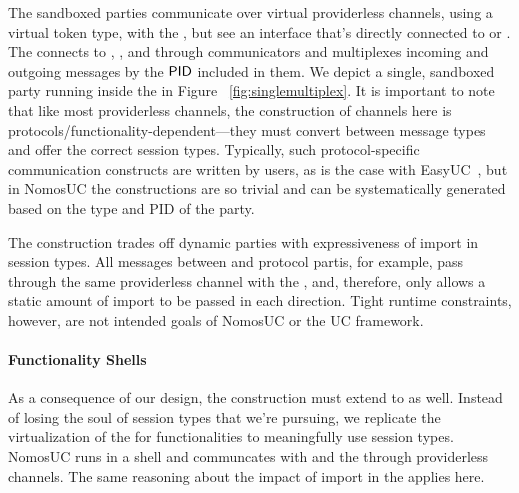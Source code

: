 The sandboxed parties communicate over virtual providerless channels, using a virtual token type, with the \partywrapper, but see an interface that's directly connected to \F or \Z. 
The \partywrapper connects to \F, \A, and \Z through communicators and multiplexes incoming and outgoing messages by the $\mathsf{PID}$ included in them. 
We depict a single, sandboxed party running inside the \partywrapper in Figure ~\ref{fig:singlemultiplex}.
It is important to note that like most providerless channels, the construction of channels here is protocols/functionality-dependent---they must convert between message types and offer the correct session types. 
Typically, such protocol-specific communication constructs are written by users, as is the case with EasyUC~\cite{easyuc}, but in NomosUC the constructions are so trivial and can be systematically generated based on the type and PID of the party.


The \partywrapper construction trades off dynamic parties with expressiveness of import in session types.
All messages between \Z and protocol partis, for example, pass through the same providerless channel with the \partywrapper, and, therefore, only allows a static amount of import to be passed in each direction.
Tight runtime constraints, however, are not intended goals of NomosUC or the UC framework.

\paragraph{Functionality Shells}
As a consequence of our design, the \partywrapper construction must extend to \F as well.
Instead of losing the soul of session types that we're pursuing, we replicate the virtualization of the \partywrapper for functionalities to meaningfully use session types. 
NomosUC runs \F in a shell and communcates with \A and the \partywrapper through providerless channels. 
The same reasoning about the impact of import in the \partywrapper applies here.

